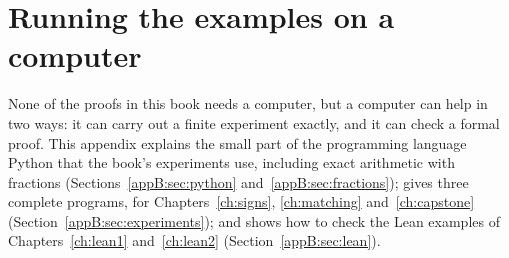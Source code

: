 \chapter{Running the examples on a computer}\label{app:practical}
None of the proofs in this book needs a computer, but a computer can help in two ways: it can carry out a finite experiment exactly, and it can check a formal proof. This appendix explains the small part of the programming language Python that the book's experiments use, including exact arithmetic with fractions (Sections~\ref{appB:sec:python} and~\ref{appB:sec:fractions}); gives three complete programs, for Chapters~\ref{ch:signs}, \ref{ch:matching} and~\ref{ch:capstone} (Section~\ref{appB:sec:experiments}); and shows how to check the Lean examples of Chapters~\ref{ch:lean1} and~\ref{ch:lean2} (Section~\ref{appB:sec:lean}).




